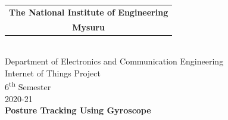 \documentclass[a4paper,12pt]{report}
\begin{document}
\begin{titlepage}
    \begin{center}
        \noindent
        \hfill
        \begin{tabular}{@{}c@{}}
            \textbf{\Large The National Institute of Engineering} \\
            \textbf{\Large{Mysuru}}
        \end{tabular}
        \hfill
         \\
        \vspace{5cm}
        {\huge Department of Electronics and Communication Engineering} \\
        \vspace{2cm}
        \large{Internet of Things Project} \\
        \large{6\textsuperscript{th} Semester} \\
        \large{2020-21} \\
        \vspace{1cm}
        \textbf{\huge Posture Tracking Using Gyroscope} \\
        \vspace{1cm}

\end{center}
\end{titlepage}
\end{document}
